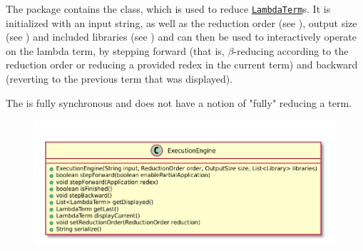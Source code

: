 The \texttt{} package contains the \texttt{}
class, which is used to reduce \texttt{\hyperref[type:edu.kit.wavelength.client.model.term.LambdaTerm]{LambdaTerm}}s.
It is initialized with an input string, as well as the reduction
order (see \texttt{}), output size (see \texttt{})
and included libraries (see \texttt{}) and can then be used to
interactively operate on the lambda term, by stepping forward (that is, $\beta$-reducing according to 
the reduction order or reducing a provided redex in the current term) and backward (reverting to the 
previous term that was displayed).

The \texttt{} is fully synchronous and does not have a notion
of "fully" reducing a term.

\begin{figure}[H]
	\centering
	\includegraphics[width=\textwidth]{packageDiagrams/modelPackage}
\end{figure}

